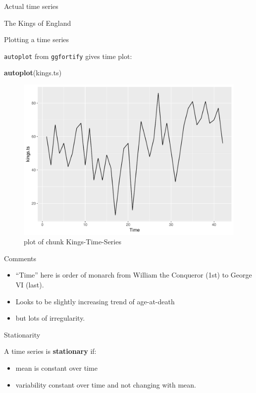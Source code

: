 \documentclass[ignorenonframetext,]{beamer}
\newenvironment{Shaded}{\begin{snugshade}}{\end{snugshade}}
\newcommand{\KeywordTok}[1]{\textcolor[rgb]{0.13,0.29,0.53}{\textbf{#1}}}
\newcommand{\NormalTok}[1]{#1}
\providecommand{\tightlist}{%
  \setlength{\itemsep}{0pt}\setlength{\parskip}{0pt}}
\begin{document}
\begin{frame}[fragile]{Actual time series}
\begin{block}{The Kings of England}
\end{block}

\begin{block}{Plotting a time series}

\texttt{autoplot} from \texttt{ggfortify} gives time plot:

\begin{Shaded}
\begin{Highlighting}[]
\KeywordTok{autoplot}\NormalTok{(kings.ts)}
\end{Highlighting}
\end{Shaded}

\begin{figure}
\centering
\includegraphics{figure/Kings-Time-Series-1.pdf}
\caption{plot of chunk Kings-Time-Series}
\end{figure}

Comments

\begin{itemize}
\item
  ``Time'' here is order of monarch from William the Conqueror (1st) to
  George VI (last).
\item
  Looks to be slightly increasing trend of age-at-death
\item
  but lots of irregularity.
\end{itemize}

\end{block}

\begin{block}{Stationarity}

A time series is \textbf{stationary} if:

\begin{itemize}
\tightlist
\item
  mean is constant over time
\item
  variability constant over time and not changing with mean.
\end{itemize}


\end{block}
\end{frame}
\end{document}
